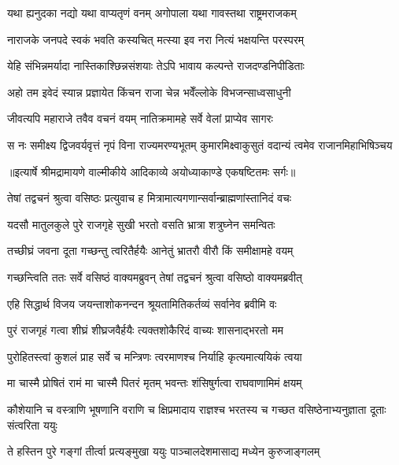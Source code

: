 \twolineshloka
{यथा ह्यनुदका नद्यो यथा वाप्यतृणं वनम्}
{अगोपाला यथा गावस्तथा राष्ट्रमराजकम्} %

\twolineshloka
{नाराजके जनपदे स्वकं भवति कस्यचित्}
{मत्स्या इव नरा नित्यं भक्षयन्ति परस्परम्} %

\twolineshloka
{येहि संभिन्नमर्यादा नास्तिकाश्छिन्नसंशयाः}
{तेऽपि भावाय कल्पन्ते राजदण्डनिपीडिताः} %

\twolineshloka
{अहो तम इवेदं स्यान्न प्रज्ञायेत किंचन}
{राजा चेन्न भवेँल्लोके विभजन्साध्वसाधुनी} %

\twolineshloka
{जीवत्यपि महाराजे तवैव वचनं वयम्}
{नातिक्रमामहे सर्वे वेलां प्राप्येव सागरः} %

\fourlineindentedshloka
{स नः समीक्ष्य द्विजवर्यवृत्तं}
{ नृपं विना राज्यमरण्यभूतम्}
{कुमारमिक्ष्वाकुसुतं वदान्यं}
{ त्वमेव राजानमिहाभिषिञ्चय} %


{॥इत्यार्षे श्रीमद्रामायणे वाल्मीकीये आदिकाव्ये अयोध्याकाण्डे एकषष्टितमः सर्गः॥}


\twolineshloka
{तेषां तद्वचनं श्रुत्वा वसिष्ठः प्रत्युवाच ह}
{मित्रामात्यगणान्सर्वान्ब्राह्मणांस्तानिदं वचः} %

\twolineshloka
{यदसौ मातुलकुले पुरे राजगृहे सुखी}
{भरतो वसति भ्रात्रा शत्रुघ्नेन समन्वितः} %

\twolineshloka
{तच्छीघ्रं जवना दूता गच्छन्तु त्वरितैर्हयैः}
{आनेतुं भ्रातरौ वीरौ किं समीक्षामहे वयम्} %

\twolineshloka
{गच्छन्त्विति ततः सर्वे वसिष्ठं वाक्यमब्रुवन्}
{तेषां तद्वचनं श्रुत्वा वसिष्ठो वाक्यमब्रवीत्} %

\twolineshloka
{एहि सिद्धार्थ विजय जयन्ताशोकनन्दन}
{श्रूयतामितिकर्तव्यं सर्वानेव ब्रवीमि वः} %

\twolineshloka
{पुरं राजगृहं गत्वा शीघ्रं शीघ्रजवैर्हयैः}
{त्यक्तशोकैरिदं वाच्यः शासनाद्भरतो मम} %

\twolineshloka
{पुरोहितस्त्वां कुशलं प्राह सर्वे च मन्त्रिणः}
{त्वरमाणश्च निर्याहि कृत्यमात्ययिकं त्वया} %

\twolineshloka
{मा चास्मै प्रोषितं रामं मा चास्मै पितरं मृतम्}
{भवन्तः शंसिषुर्गत्वा राघवाणामिमं क्षयम्} %

\threelineshloka
{कौशेयानि च वस्त्राणि भूषणानि वराणि च}
{क्षिप्रमादाय राज्ञश्च भरतस्य च गच्छत}
{वसिष्ठेनाभ्यनुज्ञाता दूताः संत्वरिता ययुः} %

\twolineshloka
{ते हस्तिन पुरे गङ्गां तीर्त्वा प्रत्यङ्मुखा ययुः}
{पाञ्चालदेशमासाद्य मध्येन कुरुजाङ्गलम्} %

